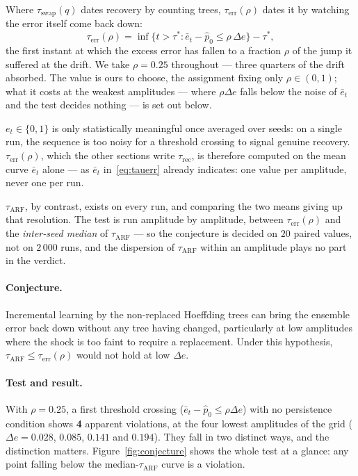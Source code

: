 \documentclass[11pt,a4paper]{article}
\begin{document}
Where $\tau_{\mathrm{swap}}(q)$ dates recovery by counting trees,
$\tau_{\mathrm{err}}(\rho)$ dates it by watching the error itself come back down:
\begin{equation}
  \tau_{\mathrm{err}}(\rho) = \inf\{t > \tau^* : \bar e_t - \hat p_0 \le \rho\,\Delta e\}
  - \tau^* ,
  \label{eq:tauerr}
\end{equation}
the first instant at which the excess error has fallen to a fraction $\rho$ of the jump
it suffered at the drift. We take $\rho = 0.25$ throughout --- three quarters of the
drift absorbed. The value is ours to choose, the assignment fixing only
$\rho \in (0,1)$; what it costs at the weakest amplitudes --- where $\rho\Delta e$ falls
below the noise of $\bar e_t$ and the test decides nothing --- is set out below.

$e_t \in \{0,1\}$ is only statistically meaningful once averaged over seeds: on a
single run, the sequence is too noisy for a threshold crossing to signal genuine
recovery. $\tau_{\mathrm{err}}(\rho)$, which the other sections write
$\tau_{\mathrm{rec}}$, is therefore computed on the mean curve $\bar e_t$ alone --- as
$\bar e_t$ in~\eqref{eq:tauerr} already indicates: one value per amplitude, never one
per run.

$\tau_{\mathrm{ARF}}$, by contrast, exists on every run, and comparing the two means
giving up that resolution. The test is run amplitude by amplitude, between
$\tau_{\mathrm{err}}(\rho)$ and the \emph{inter-seed median} of $\tau_{\mathrm{ARF}}$ ---
so the conjecture is decided on $20$ paired values, not on $2\,000$ runs, and the
dispersion of $\tau_{\mathrm{ARF}}$ within an amplitude plays no part in the verdict.

\paragraph{Conjecture.} Incremental learning by the non-replaced Hoeffding trees can
bring the ensemble error back down without any tree having changed, particularly at
low amplitudes where the shock is too faint to require a replacement. Under this
hypothesis, $\tau_{\mathrm{ARF}} \le \tau_{\mathrm{err}}(\rho)$ would not hold at low
$\Delta e$.

\paragraph{Test and result.} With $\rho = 0.25$, a first threshold crossing
($\bar e_t - \hat p_0 \le \rho \Delta e$) with no persistence condition shows
\textbf{4} apparent violations, at the four lowest amplitudes of the grid
($\Delta e = 0.028$, $0.085$, $0.141$ and $0.194$). They fall in two distinct ways, and
the distinction matters. Figure~\ref{fig:conjecture} shows the whole test at a glance:
any point falling below the median-$\tau_{\mathrm{ARF}}$ curve is a violation.
\end{document}
